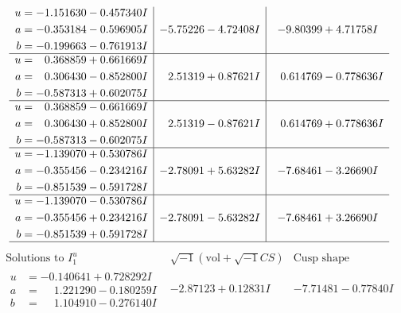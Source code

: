 \documentclass[1p]{elsarticle_modified}
\theoremstyle{definition}
\newcommand{\I}{\sqrt{-1}}
\begin{document}
$$\begin{array}{c|c|c}
\begin{aligned}
u &= -1.151630 - 0.457340 I \\
a &= -0.353184 - 0.596905 I \\
b &= -0.199663 - 0.761913 I\end{aligned}
 & -5.75226 - 4.72408 I & -9.80399 + 4.71758 I \\ \hline\begin{aligned}
u &= \phantom{-}0.368859 + 0.661669 I \\
a &= \phantom{-}0.306430 - 0.852800 I \\
b &= -0.587313 + 0.602075 I\end{aligned}
 & \phantom{-}2.51319 + 0.87621 I & \phantom{-}0.614769 - 0.778636 I \\ \hline\begin{aligned}
u &= \phantom{-}0.368859 - 0.661669 I \\
a &= \phantom{-}0.306430 + 0.852800 I \\
b &= -0.587313 - 0.602075 I\end{aligned}
 & \phantom{-}2.51319 - 0.87621 I & \phantom{-}0.614769 + 0.778636 I \\ \hline\begin{aligned}
u &= -1.139070 + 0.530786 I \\
a &= -0.355456 - 0.234216 I \\
b &= -0.851539 - 0.591728 I\end{aligned}
 & -2.78091 + 5.63282 I & -7.68461 - 3.26690 I \\ \hline\begin{aligned}
u &= -1.139070 - 0.530786 I \\
a &= -0.355456 + 0.234216 I \\
b &= -0.851539 + 0.591728 I\end{aligned}
 & -2.78091 - 5.63282 I & -7.68461 + 3.26690 I\\
 \hline 
 \end{array}$$\newpage$$\begin{array}{c|c|c}  
\text{Solutions to }I^u_{1}& \I (\text{vol} + \sqrt{-1}CS) & \text{Cusp shape}\\
 \hline 
\begin{aligned}
u &= -0.140641 + 0.728292 I \\
a &= \phantom{-}1.221290 - 0.180259 I \\
b &= \phantom{-}1.104910 - 0.276140 I\end{aligned}
 & -2.87123 + 0.12831 I & -7.71481 - 0.77840 I \\ \hline\begin{aligned}

\end{aligned}
\end{array}$$
\end{document}
